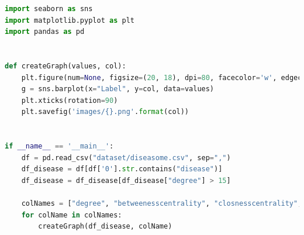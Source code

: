 \documentclass{uimppracticas}
\begin{document}
\begin{lstlisting}[language=Python, basicstyle=\small]
import seaborn as sns
import matplotlib.pyplot as plt
import pandas as pd


def createGraph(values, col):
	plt.figure(num=None, figsize=(20, 18), dpi=80, facecolor='w', edgecolor='r')
	g = sns.barplot(x="Label", y=col, data=values)
	plt.xticks(rotation=90)
	plt.savefig('images/{}.png'.format(col))


if __name__ == '__main__':
	df = pd.read_csv("dataset/diseasome.csv", sep=",")
	df_disease = df[df['0'].str.contains("disease")]
	df_disease = df_disease[df_disease["degree"] > 15]
	
	colNames = ["degree", "betweenesscentrality", "closnesscentrality", "eigencentrality"]
	for colName in colNames:
		createGraph(df_disease, colName)
\end{lstlisting}

\newpage

\renewcommand{\refname}{Bibliografía}


\end{document}
